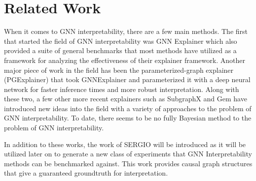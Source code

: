 \section{Related Work}
\label{sec:related}
When it comes to GNN interpretability, there are a few main methods. The first that started the field of GNN interpretability was GNN Explainer \cite{ying_gnnexplainer_2019} which also provided a suite of general benchmarks that most methods have utilized as a framework for analyzing the effectiveness of their explainer framework. Another major piece of work in the field has been the parameterized-graph explainer (PGExplainer) \cite{luo_parameterized_2020} that took GNNExplainer and parameterized it with a deep neural network for faster inference times and more robust interpretation. Along with these two, a few other more recent explainers such as SubgraphX \cite{yuan_explainability_2021} and Gem \cite{lin_generative_2021} have introduced new ideas into the field with a variety of approaches to the problem of GNN interpretability. To date, there seems to be no fully Bayesian method to the problem of GNN interpretability.

In addition to these works, the work of SERGIO \cite{dibaeinia_sergio_2020} will be introduced as it will be utilized later on to generate a new class of experiments that GNN Interpretability methods can be benchmarked against. This work provides causal graph structures that give a guaranteed groundtruth for interpretation.


